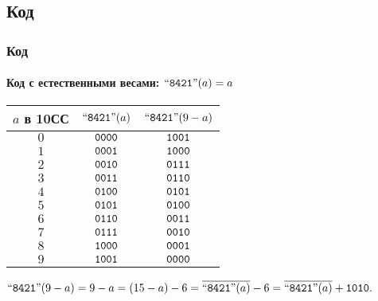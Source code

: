 \subsection{Код \NaturalLabel}


\begin{frame}
    \frametitle{Код \NaturalLabel}
    \framesubtitle{Код с естественными весами: $\text{``\texttt{8421}''}(a)=a$}
    
    \begin{center}
    \begin{tabular}{|c|c|c|}
        \hline\hline
        $a$ в 10СС  & $\text{``\texttt{8421}''}(a)$         & $\text{``\texttt{8421}''}(9-a)$\\
        \hline\hline
        $0$         & $\texttt{0000}$       & $\texttt{1001}$ \\
        $1$         & $\texttt{0001}$       & $\texttt{1000}$ \\
        $2$         & $\texttt{0010}$       & $\texttt{0111}$ \\
        $3$         & $\texttt{0011}$       & $\texttt{0110}$ \\
        $4$         & $\texttt{0100}$       & $\texttt{0101}$ \\
        $5$         & $\texttt{0101}$       & $\texttt{0100}$ \\
        $6$         & $\texttt{0110}$       & $\texttt{0011}$ \\
        $7$         & $\texttt{0111}$       & $\texttt{0010}$ \\
        $8$         & $\texttt{1000}$       & $\texttt{0001}$ \\
        $9$         & $\texttt{1001}$       & $\texttt{0000}$ \\
        \hline
    \end{tabular}
    \end{center}
    $\text{``\texttt{8421}''}(9-a)=9-a=(15-a)-6=\overline{\text{``\texttt{8421}''}(a)}-6=\overline{\text{``\texttt{8421}''}(a)}+\texttt{1010}.$
\end{frame}

